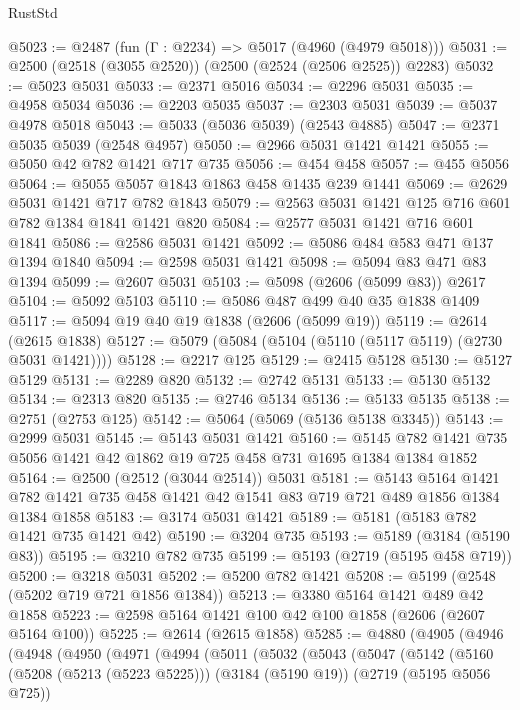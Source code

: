 \begin{lexlean}{RustStd}
\begin{coremodule}
@5023 := @2487 (fun (Γ : @2234) => @5017 (@4960 (@4979 @5018)))
@5031 := @2500 (@2518 (@3055 @2520)) (@2500 (@2524 (@2506 @2525)) @2283)
@5032 := @5023 @5031
@5033 := @2371 @5016
@5034 := @2296 @5031
@5035 := @4958 @5034
@5036 := @2203 @5035
@5037 := @2303 @5031
@5039 := @5037 @4978 @5018
@5043 := @5033 (@5036 @5039) (@2543 @4885)
@5047 := @2371 @5035 @5039 (@2548 @4957)
@5050 := @2966 @5031 @1421 @1421
@5055 := @5050 @42 @782 @1421 @717 @735
@5056 := @454 @458
@5057 := @455 @5056
@5064 := @5055 @5057 @1843 @1863 @458 @1435 @239 @1441
@5069 := @2629 @5031 @1421 @717 @782 @1843
@5079 := @2563 @5031 @1421 @125 @716 @601 @782 @1384 @1841 @1421 @820
@5084 := @2577 @5031 @1421 @716 @601 @1841
@5086 := @2586 @5031 @1421
@5092 := @5086 @484 @583 @471 @137 @1394 @1840
@5094 := @2598 @5031 @1421
@5098 := @5094 @83 @471 @83 @1394
@5099 := @2607 @5031
@5103 := @5098 (@2606 (@5099 @83)) @2617
@5104 := @5092 @5103
@5110 := @5086 @487 @499 @40 @35 @1838 @1409
@5117 := @5094 @19 @40 @19 @1838 (@2606 (@5099 @19))
@5119 := @2614 (@2615 @1838)
@5127 := @5079 (@5084 (@5104 (@5110 (@5117 @5119) (@2730 @5031 @1421))))
@5128 := @2217 @125
@5129 := @2415 @5128
@5130 := @5127 @5129
@5131 := @2289 @820
@5132 := @2742 @5131
@5133 := @5130 @5132
@5134 := @2313 @820
@5135 := @2746 @5134
@5136 := @5133 @5135
@5138 := @2751 (@2753 @125)
@5142 := @5064 (@5069 (@5136 @5138 @3345))
@5143 := @2999 @5031
@5145 := @5143 @5031 @1421
@5160 := @5145 @782 @1421 @735 @5056 @1421 @42 @1862 @19 @725 @458 @731 @1695 @1384 @1384 @1852
@5164 := @2500 (@2512 (@3044 @2514)) @5031
@5181 := @5143
    @5164
    @1421
    @782
    @1421
    @735
    @458
    @1421
    @42
    @1541
    @83
    @719
    @721
    @489
    @1856
    @1384
    @1384
    @1858
@5183 := @3174 @5031 @1421
@5189 := @5181 (@5183 @782 @1421 @735 @1421 @42)
@5190 := @3204 @735
@5193 := @5189 (@3184 (@5190 @83))
@5195 := @3210 @782 @735
@5199 := @5193 (@2719 (@5195 @458 @719))
@5200 := @3218 @5031
@5202 := @5200 @782 @1421
@5208 := @5199 (@2548 (@5202 @719 @721 @1856 @1384))
@5213 := @3380 @5164 @1421 @489 @42 @1858
@5223 := @2598 @5164 @1421 @100 @42 @100 @1858 (@2606 (@2607 @5164 @100))
@5225 := @2614 (@2615 @1858)
@5285 := @4880
    (@4905
      (@4946
        (@4948
          (@4950
            (@4971
              (@4994
                (@5011
                  (@5032
                    (@5043
                      (@5047
                        (@5142
                          (@5160
                            (@5208 (@5213 (@5223 @5225)))
                            (@3184 (@5190 @19))
                            (@2719 (@5195 @5056 @725))

\end{coremodule}
\end{lexlean}
